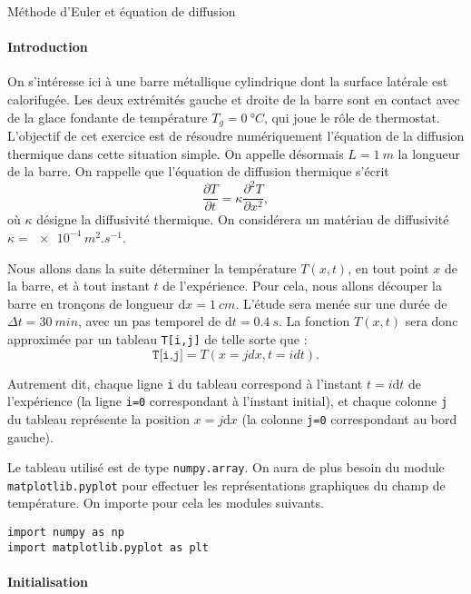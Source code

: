 \begin{exo}[1][python]{Méthode d'Euler et équation de diffusion}

  \paragraph{Introduction}
    On s'intéresse ici à une barre métallique cylindrique dont la surface latérale est calorifugée. Les deux extrémités gauche et droite de la barre sont en contact avec de la glace fondante de température $T_g = \SI{0}{\degree C}$, qui joue le rôle de thermostat.  L’objectif de cet exercice est de résoudre numériquement l’équation de la diffusion thermique dans cette situation simple. On appelle désormais $L=\SI{1}{m}$ la longueur de la barre. On rappelle que l'équation de diffusion thermique s'écrit
    $$
    \boxed{
    \frac{\partial T}{\partial t} = \kappa \frac{\partial^2 T}{\partial x^2},
    }
    $$
    où $\kappa$ désigne la diffusivité thermique. On considérera un matériau de diffusivité $\kappa=\SI{e-4}{m^2.s^{-1}}$.
    
    
    Nous allons dans la suite déterminer la température $T(x,t)$, en tout point $x$ de la barre,
     et à tout instant $t$ de l'expérience. Pour cela, nous allons découper la barre en tronçons de longueur $\mathrm{d} x=\SI{1}{cm}$.
    L'étude sera menée sur une durée de $\Delta t = \SI{30}{min}$, avec un pas temporel de $\mathrm{d} t=\SI{0,4}{s}$. La fonction $T(x,t)$ sera donc approximée par un tableau \texttt{T[i,j]} de telle sorte que :
    $$
    \boxed{
      \texttt{T[i,j]} = T(x=j dx,t=i dt).
    }$$
    
    Autrement dit, chaque ligne \texttt{i} du tableau correspond à l'instant $t=i\mathrm{d}t$ de l'expérience (la ligne \texttt{i=0} correspondant à l'instant initial), et chaque colonne \texttt{j} du tableau représente la position $x=j\mathrm{d}x$ (la colonne \texttt{j=0} correspondant au bord gauche).
    
    Le tableau utilisé est de type \texttt{numpy.array}. On aura de plus besoin du module \texttt{matplotlib.pyplot} pour effectuer les représentations graphiques du champ de température. On importe pour cela les modules suivants. 
\begin{verbatim}
import numpy as np
import matplotlib.pyplot as plt
\end{verbatim}
    
    \paragraph{Initialisation}
    \begin{questions}
      \item	
    

\end{questions}
\end{exo}
